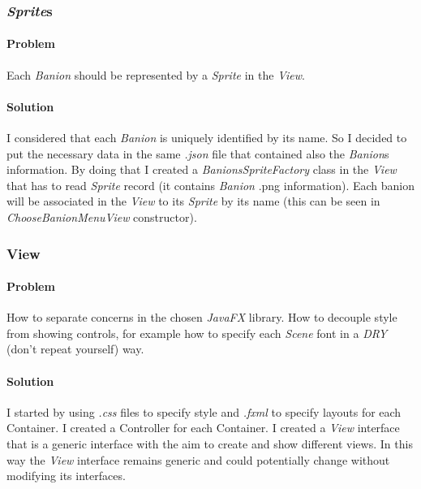 \documentclass[12pt, a4paper]{report}
\begin{document}
        \subsubsection{\emph{Sprite}s}

            \paragraph{Problem}

            Each \emph{Banion} should be represented by a \emph{Sprite} in the \emph{View}.

            \paragraph{Solution}

            I considered that each \emph{Banion} is uniquely identified by its name.
            So I decided to put the necessary data in the same \textit{.json} file that contained also the \emph{Banion}s information.
            By doing that I created a \emph{BanionsSpriteFactory} class in the \emph{View} that has to read \emph{Sprite} record (it contains \emph{Banion} .png information).
            Each banion will be associated in the \emph{View} to its \emph{Sprite} by its name (this can be seen in \emph{ChooseBanionMenuView} constructor).
            
        \pagebreak

        \subsubsection{View}

            \paragraph{Problem}

            How to separate concerns in the chosen \emph{JavaFX} library.
            How to decouple style from showing controls, for example how to specify each \emph{Scene} font in a \emph{DRY} (don't repeat yourself) way.

            \paragraph{Solution}

            I started by using \textit{.css} files to specify style and \textit{.fxml} to specify layouts for each Container.
            I created a Controller for each Container.
            I created a \textit{View} interface that is a generic interface with the aim to create and show different views.
            In this way the \textit{View} interface remains generic and could potentially change without modifying its interfaces.
\end{document}
